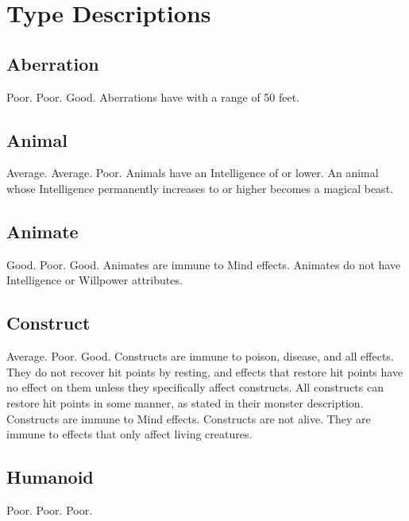 \section{Type Descriptions}

    \subsection{Aberration}
         Poor.
         Poor.
         Good.
         Aberrations have  with a range of 50 feet.

    \subsection{Animal}
         Average.
         Average.
         Poor.
         Animals have an Intelligence of  or lower.
        An animal whose Intelligence permanently increases to  or higher becomes a magical beast.

    \subsection{Animate}
         Good.
         Poor.
         Good.
         Animates are immune to Mind effects.
         Animates do not have Intelligence or Willpower attributes.

    \subsection{Construct}
         Average.
         Poor.
         Good.
         Constructs are immune to poison, disease, and all  effects.
        They do not recover hit points by resting, and effects that restore hit points have no effect on them unless they specifically affect constructs.
        All constructs can restore hit points in some manner, as stated in their monster description.
         Constructs are immune to Mind effects.
         Constructs are not alive.
        They are immune to effects that only affect living creatures.

    \subsection{Humanoid}
         Poor.
         Poor.
         Poor.

